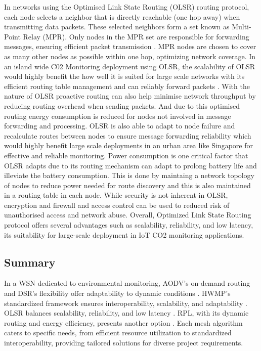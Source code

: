 In networks using the Optimised Link State Routing (OLSR) routing protocol, each node selects a neighbor that is directly reachable (one hop away) when transmitting data packets. These selected neighbors form a set known as Multi-Point Relay (MPR). Only nodes in the MPR set are responsible for forwarding messages, ensuring efficient packet transmission\cite{Kakade2017Performance} \cite{OLSR_IETF}. MPR nodes are chosen to cover as many other nodes as possible within one hop, optimizing network coverage\cite{Ahn2014}. 
In an island wide C02  Monitoring deployment using OLSR, the scalability of OLSR would highly benefit the how well it is suited for large scale networks with its efficient routing table management and can reliably forward packets . 
With the nature of OLSR proactive routing can also help minimise network throughput by reducing routing overhead when sending packets. And due to this optimised routing energy consumption is reduced for nodes not involved in message forwarding and processing\cite{Guo_2011}.
OLSR is also able to adapt to node failure and recalculate routes between nodes to ensure message forwarding reliability which would highly benefit large scale deployments in an urban area like Singapore for effective and reliable monitoring.
Power consumption is one critical factor that OLSR adapts due to its routing mechanism can adapt to prolong battery life and illeviate the battery consumption\cite{Jubair_2019}. This is done by maintaing a network topology of nodes to reduce power needed for route discovery and this is also maintained in a routing table in each node.
While security is not inherent in OLSR, encryption and firewall and access control can be used to reduced risk of unauthorised access and network abuse.
Overall, Optimized Link State Routing protocol offers several advantages such as scalability, reliability, and low latency, its suitability for large-scale deployment in IoT CO2 monitoring applications.


\subsection{Summary}\label{sec:lr_summary}

In a WSN dedicated to environmental monitoring, AODV's on-demand routing and DSR's flexibility offer adaptability to dynamic conditions \cite{BELDINGROYER2003125, 5431521}. HWMP's standardized framework ensures interoperability, scalability, and adaptability \cite{Yang_Ma_Miao_2009}. OLSR balances scalability, reliability, and low latency \cite{Kakade2017Performance, OLSR_IETF}. RPL, with its dynamic routing and energy efficiency, presents another option \cite{rechache_study_2021, alexander_rpl_2012, Kharrufa2019RPL-Based}. Each mesh algorithm caters to specific needs, from efficient resource utilization to standardized interoperability, providing tailored solutions for diverse project requirements.






